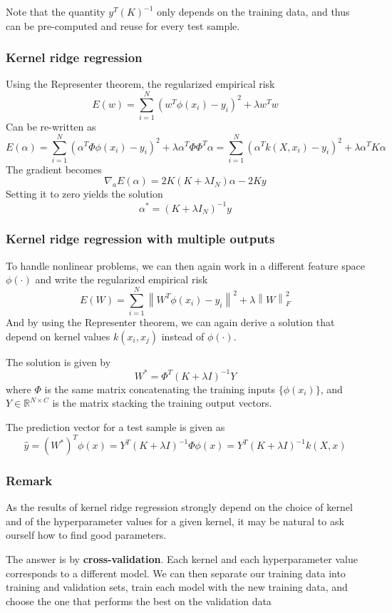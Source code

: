 Note that the quantity $y^T (K)^{-1}$ only depends on the training
data, and thus can be pre-computed and reuse for every test sample. 

\subsubsection{Kernel ridge regression}
Using the Representer theorem, the regularized empirical risk \[
  E(w) = \sum_{i=1}^{N} (w^T \phi(x_i) - y_i)^2 + \lambda w^Tw
\]
Can be re-written as \[
  E(\alpha) = \sum_{i=1}^{N} (\alpha ^T \Phi \phi(x_i) - y_i)^2 + \lambda \alpha ^T \Phi \Phi ^T \alpha =  \sum_{i=1}^{N} (\alpha ^T k(X, x_i) - y_i)^2 + \lambda \alpha ^T K \alpha 
\]
The gradient becomes \[
  \nabla _a E(\alpha) = 2K (K+ \lambda I_N)\alpha - 2Ky
\]Setting it to zero yields the solution \[
\alpha ^* = (K + \lambda I_N)^{-1}y
\]

\subsubsection{Kernel ridge regression with multiple outputs}

To handle nonlinear problems, we can then again work in a
different feature space $\phi (\cdot)$ and write the regularized
empirical risk
\[
  E(W) = \sum_{i=1}^{N} \left\|W^T \phi(x_i) - y_i\right\|^2 + \lambda \left\|W\right\|_F^2
\]
And by using the Representer theorem, we can again derive a solution that depend on kernel values $k(x_i, x_j)$ instead of $\phi(\cdot)$. 

The solution is given by \[
  W^* = \Phi ^T (K + \lambda I)^{-1} Y 
\]where $\Phi$ is the same matrix concatenating the training inputs $\{ \phi(x_i) \}$, and $Y \in \mathbb{R}^{N \times C}$ is the matrix stacking the training output vectors. 

The prediction vector for a test sample is given as \[
  \hat{y} = (W^*)^T \phi(x) = Y^T (K + \lambda I)^{-1} \Phi \phi(x) = Y^T (K + \lambda I)^{-1} k(X,x)
\]
\subsubsection{Remark}
As the results of kernel ridge regression strongly depend on the choice of kernel and of the hyperparameter values for a given kernel, it may be natural to ask ourself how to find good parameters. 

The answer is by \textbf{cross-validation}. Each kernel and each hyperparameter value
corresponds to a different model. We can then separate our training
data into training and validation sets, train each model with the new
training data, and choose the one that performs the best on the
validation data

